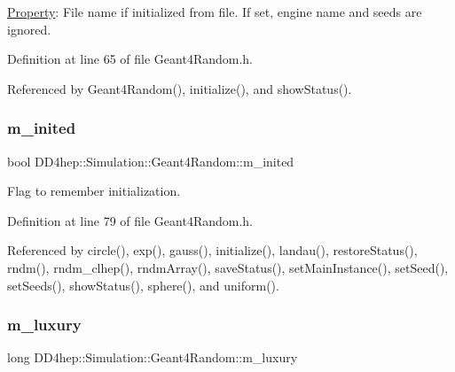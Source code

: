 \hyperlink{class_d_d4hep_1_1_property}{Property}\+: File name if initialized from file. If set, engine name and seeds are ignored. 



Definition at line 65 of file Geant4\+Random.\+h.



Referenced by Geant4\+Random(), initialize(), and show\+Status().

\hypertarget{class_d_d4hep_1_1_simulation_1_1_geant4_random_aa8dd0cf1aa819f72ec19b69b6ae171c5}{}\label{class_d_d4hep_1_1_simulation_1_1_geant4_random_aa8dd0cf1aa819f72ec19b69b6ae171c5} 
\subsubsection{\texorpdfstring{m\+\_\+inited}{m\_inited}}
{\footnotesize\ttfamily bool D\+D4hep\+::\+Simulation\+::\+Geant4\+Random\+::m\+\_\+inited\hspace{0.3cm}{\ttfamily [protected]}}



Flag to remember initialization. 



Definition at line 79 of file Geant4\+Random.\+h.



Referenced by circle(), exp(), gauss(), initialize(), landau(), restore\+Status(), rndm(), rndm\+\_\+clhep(), rndm\+Array(), save\+Status(), set\+Main\+Instance(), set\+Seed(), set\+Seeds(), show\+Status(), sphere(), and uniform().

\hypertarget{class_d_d4hep_1_1_simulation_1_1_geant4_random_aa74af649720c65fd7e4e9d357e77c01d}{}\label{class_d_d4hep_1_1_simulation_1_1_geant4_random_aa74af649720c65fd7e4e9d357e77c01d} 
\subsubsection{\texorpdfstring{m\+\_\+luxury}{m\_luxury}}
{\footnotesize\ttfamily long D\+D4hep\+::\+Simulation\+::\+Geant4\+Random\+::m\+\_\+luxury\hspace{0.3cm}{\ttfamily [protected]}}



